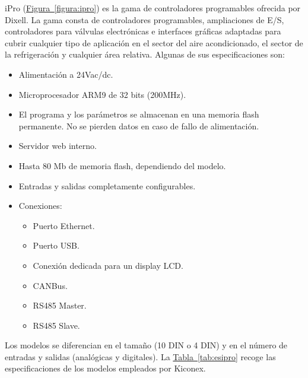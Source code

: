 iPro (\hyperref[figura:ipro]{Figura~\ref{figura:ipro}}) es la gama de controladores programables ofrecida por Dixell. La gama consta de controladores programables, ampliaciones de E/S, controladores para válvulas electrónicas e interfaces gráficas adaptadas para cubrir cualquier tipo de aplicación en el sector del aire acondicionado, el sector de la refrigeración y cualquier área relativa. Algunas de sus especificaciones son:

\begin{itemize}
  \item Alimentación a 24Vac/dc.
  \item Microprocesador ARM9 de 32 bits (200MHz).
  \item El programa y los parámetros se almacenan en una memoria flash permanente. No se pierden datos en caso de fallo de alimentación.
  \item Servidor web interno.
  \item Hasta 80 Mb de memoria flash, dependiendo del modelo.
  \item Entradas y salidas completamente configurables.
  \item Conexiones:
  \begin{itemize}
    \item Puerto Ethernet.
    \item Puerto USB.
    \item Conexión dedicada para un display LCD.
    \item CANBus.
    \item RS485 Master.
    \item RS485 Slave.
  \end{itemize}
\end{itemize}

Los modelos se diferencian en el tamaño (10 DIN o 4 DIN) y en el número de entradas y salidas (analógicas y digitales). La \hyperref[tab:esipro]{Tabla~\ref{tab:esipro}} recoge las especificaciones de los modelos empleados por Kiconex.


